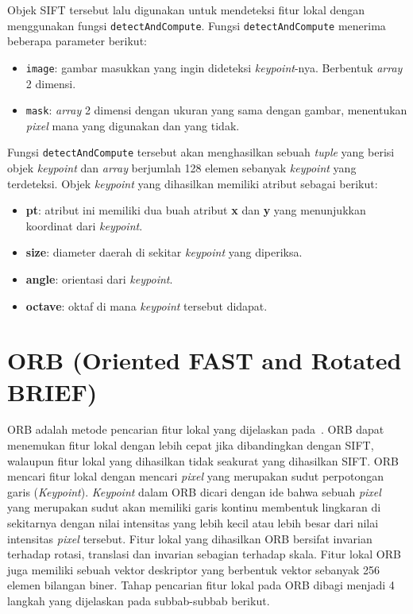 Objek SIFT tersebut lalu digunakan untuk mendeteksi fitur lokal dengan menggunakan fungsi \texttt{detectAndCompute}. Fungsi \texttt{detectAndCompute} menerima beberapa parameter berikut:
\begin{itemize}
	\item \texttt{image}: gambar masukkan yang ingin dideteksi \textit{keypoint}-nya. Berbentuk \textit{array} 2 dimensi.
	\item \texttt{mask}: \textit{array} 2 dimensi dengan ukuran yang sama dengan gambar, menentukan \textit{pixel} mana yang digunakan dan yang tidak.
\end{itemize}

Fungsi \texttt{detectAndCompute} tersebut akan menghasilkan sebuah \textit{tuple} yang berisi objek \textit{keypoint} dan \textit{array} berjumlah 128 elemen sebanyak \textit{keypoint} yang terdeteksi. Objek \textit{keypoint} yang dihasilkan memiliki atribut sebagai berikut:
\begin{itemize}
	\item \textbf{pt}: atribut ini memiliki dua buah atribut \textbf{x} dan \textbf{y} yang menunjukkan koordinat dari \textit{keypoint}.
	\item \textbf{size}: diameter daerah di sekitar \textit{keypoint} yang diperiksa.
	\item \textbf{angle}: orientasi dari \textit{keypoint}.
	\item \textbf{octave}: oktaf di mana \textit{keypoint} tersebut didapat.
\end{itemize} 

\section{ORB (Oriented FAST and Rotated BRIEF)}
\label{sec:orb}
ORB adalah metode pencarian fitur lokal yang dijelaskan pada~\cite{rublee2011orb}. ORB dapat menemukan fitur lokal dengan lebih cepat jika dibandingkan dengan SIFT, walaupun fitur lokal yang dihasilkan tidak seakurat yang dihasilkan SIFT. ORB mencari fitur lokal dengan mencari \textit{pixel} yang merupakan sudut perpotongan garis (\textit{Keypoint}). \textit{Keypoint} dalam ORB dicari dengan ide bahwa sebuah \textit{pixel} yang merupakan sudut akan memiliki garis kontinu membentuk lingkaran di sekitarnya dengan nilai intensitas yang lebih kecil atau lebih besar dari nilai intensitas \textit{pixel} tersebut. Fitur lokal yang dihasilkan ORB bersifat invarian terhadap rotasi, translasi dan invarian sebagian terhadap skala. Fitur lokal ORB juga memiliki sebuah vektor deskriptor yang berbentuk vektor sebanyak 256 elemen bilangan biner. Tahap pencarian fitur lokal pada ORB dibagi menjadi 4 langkah yang dijelaskan pada subbab-subbab berikut.

